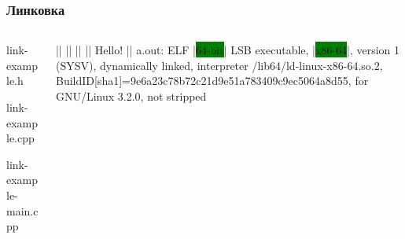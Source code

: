 \documentclass[compress]{beamer}
\begin{document}
\begin{frame}[fragile]

    \frametitle{Линковка}

    \begin{columns}[T]

        \begin{column}{0.4\textwidth}

                {link-example.h}

                {link-example.cpp}

                {link-example-main.cpp}

        \end{column}

        \begin{column}{0.6\textwidth}

            \begin{terminalwindow}[||]
||
||
||
||
Hello!
||
a.out: ELF |\colorbox{green}{64-bit}| LSB executable, |\colorbox{green}{x86-64}|, version 1 (SYSV), dynamically linked, interpreter /lib64/ld-linux-x86-64.so.2, BuildID[sha1]=9e6a23c78b72c21d9e51a783409c9ec5064a8d55, for GNU/Linux 3.2.0, not stripped
            \end{terminalwindow}

        \end{column}

    \end{columns}

\end{frame}
\end{document}
